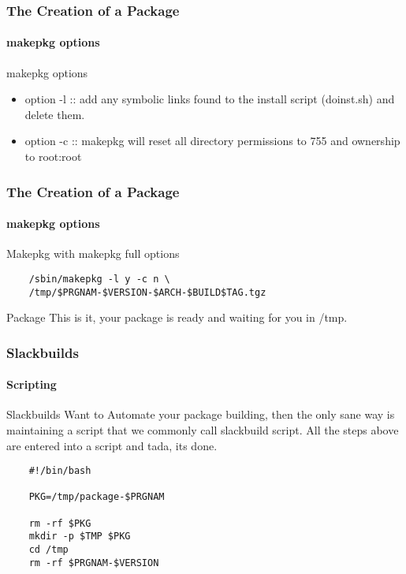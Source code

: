 \documentclass[1pt,hyperref={pdfpagelabels=true}]{beamer}
\begin{document}
\begin{frame}
  \frametitle{The Creation of a Package}
  \framesubtitle{makepkg options}
  
  \begin{example}{makepkg options}
    \begin{itemize}[<+-| alert@+>]
    \item option -l :: add any symbolic links found to the install script
      (doinst.sh) and delete them.
    \item option -c :: makepkg will reset all directory permissions to 755 and
      ownership to root:root
    \end{itemize}
  \end{example}
  
\end{frame}

\begin{frame}[fragile]
  \frametitle{The Creation of a Package}
  \framesubtitle{makepkg options}
  
  \begin{block}{Makepkg}
    with makepkg full options
  \end{block}
  
  \begin{lstlisting}
    /sbin/makepkg -l y -c n \
    /tmp/$PRGNAM-$VERSION-$ARCH-$BUILD$TAG.tgz
  \end{lstlisting}
  
  \pause
  
  \begin{block}{Package}
    This is it, your package is ready and waiting for you in /tmp.
  \end{block}
  
\end{frame}

\begin{frame}[fragile]
  \frametitle{Slackbuilds}
  \framesubtitle{Scripting}
  
  \begin{block}{Slackbuilds}
    Want to Automate your package building, then the only sane way is
    maintaining a script that we commonly call slackbuild script.
    All the steps above are entered into a script and tada, its done.
  \end{block}
  
  \pause
  
  \begin{lstlisting}
    #!/bin/bash
    
    PKG=/tmp/package-$PRGNAM
    
    rm -rf $PKG
    mkdir -p $TMP $PKG
    cd /tmp
    rm -rf $PRGNAM-$VERSION
  \end{lstlisting}
  
\end{frame}
\end{document}
